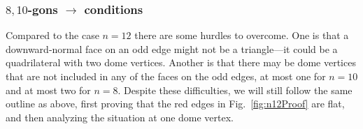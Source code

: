 \documentclass[11pt]{article}
\newcommand{\hide}[1]{}
\newcommand{\seclab}[1]{\label{sec:#1}}
\newcommand{\figref}[1]{\ref{fig:#1}}
\newcommand{\JOR}[1]{{\color{red} JOR: [#1]}}
\newcommand{\jor}[1]{{\color{cyan} #1}}
\newcommand{\Anna}[1]{{\color{red} Anna: [#1]}}
\begin{document}
\subsubsection{$8,10$-gons $\to$ conditions}
\seclab{n810Proof}
Compared to the case $n=12$ there are some hurdles to overcome. 
One is that a 
downward-normal face on an odd  edge 
might
not be a triangle---it %
could
be a quadrilateral with two
dome vertices.
Another is that there may be 
dome vertices that are not included in any of the faces on the odd edges,
at most one for $n=10$ and at most two for $n=8$.  
Despite these difficulties, we will still 
follow the same outline as above, first proving
that the red edges in Fig.~\figref{n12Proof} are flat, and then analyzing the situation at one dome vertex.

%
\hide{These two cases are more difficult than $n=12$, because we can no longer argue (in step (2) above)
\Anna{Should we say: that the faces on even edges are triangles?  I mean, aren't we stuck even if all dome vertices are private?}
\JOR{Not sure how to respond to this. The original seems
to me to be true, and reads well.
This is just an introduction, so we don't need
absolute precision. As long as the steps to follow
are correct.}
that every dome vertex is private,
which was crucial for proving that red edges are flat.
For $n=10$ we may have one non-private dome vertex.  For $n=8$ we could have two non-private dome vertices.
} %
\end{document}
